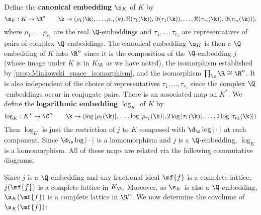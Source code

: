     Define the \textbf{canonical embedding} $\s_{K}$ of $K$ by
    \[
      \s_{K}:K \to \R^{n} \qquad \k \to (\rho_{1}(\k),\ldots,\rho_{r_{1}}(k),\Re(\tau_{1}(\k)),\Im(\tau_{1}(\k)),\ldots,\Re(\tau_{r_{2}}(\k)),\Im(\tau_{r_{2}}(\k))),
    \]
    where $\rho_{1},\ldots,\rho_{r_{1}}$ are the real $\Q$-embeddings and $\tau_{1},\ldots,\tau_{r_{2}}$ are representatives of pairs of complex $\Q$-embeddings. The canonical embedding $\s_{K}$ is then a $\Q$-embedding of $K$ into $\R^{n}$ since it is the composition of the $\Q$-embedding $j$ (whose image under $K$ is in $K_{\R}$ as we have noted), the isomorphism established by \cref{prop:Minkowski_space_isomorphism}, and the isomorphism $\prod_{\s}\R \cong \R^{n}$. It is also independent of the choice of representatives $\tau_{1},\ldots,\tau_{r_{2}}$ since the complex $\Q$-embeddings occur in conjugate pairs. There is an associated map on $K^{\ast}$. We define the \textbf{logarithmic embedding} $\log_{K}$ of $K$ by
    \[
      \log_{K}:K^{\ast} \to \C^{n} \qquad \k \to (\log|\rho_{1}(\k)|,\ldots,\log|\rho_{r_{1}}(\k)|,2\log|\tau_{1}(\k)|,\ldots,2\log|\tau_{r_{2}}(\k)|)
    \]
    Then $\log_{K}$ is just the restriction of $j$ to $K$ composed with $\d_{\s}\log|\cdot|$ at each component. Since $\d_{\s}\log|\cdot|$ is a homomorphism and $j$ is a $\Q$-embedding, $\log_{K}$ is a homomorphism. All of these maps are related via the following commutative diagrams:

    \begin{center}
      \quad {} \quad
    \end{center}
    
    Since $j$ is a $\Q$-embedding and any fractional ideal $\mf{f}$ is a complete lattice, $j(\mf{f})$ is a complete lattice in $K_{\R}$. Moreover, as $\s_{K}$ is also a $\Q$-embedding, $\s_{K}(\mf{f})$ is a complete lattice in $\R^{n}$. We now determine the covolume of $\s_{K}(\mf{f})$:
    
